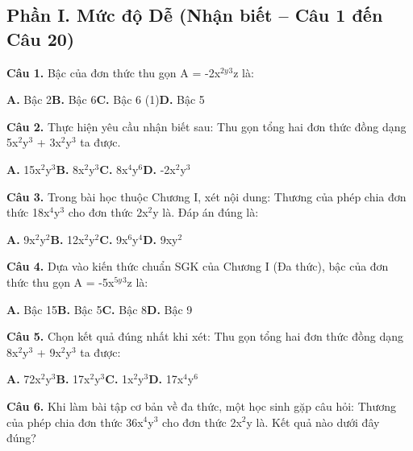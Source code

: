 \documentclass[11pt,a4paper]{article}
\begin{document}
\subsection*{\color{accent} Phần I. Mức độ Dễ (Nhận biết -- Câu 1 đến Câu 20)}
\textbf{\color{primary} Câu 1.} Bậc của đơn thức thu gọn A = -2x$^{2y}$$^3$z là:\par
\hspace*{1.5em}\textbf{A.} Bậc 2\quad\quad \textbf{B.} Bậc 6\quad\quad \textbf{C.} Bậc 6 (1)\quad\quad \textbf{D.} Bậc 5\par\vspace{2pt}
\textbf{\color{primary} Câu 2.} Thực hiện yêu cầu nhận biết sau: Thu gọn tổng hai đơn thức đồng dạng 5x$^2$y$^3$ + 3x$^2$y$^3$ ta được.\par
\hspace*{1.5em}\textbf{A.} 15x$^2$y$^3$\quad\quad \textbf{B.} 8x$^2$y$^3$\quad\quad \textbf{C.} 8x$^4$y$^6$\quad\quad \textbf{D.} -2x$^2$y$^3$\par\vspace{2pt}
\textbf{\color{primary} Câu 3.} Trong bài học thuộc Chương I, xét nội dung: Thương của phép chia đơn thức 18x$^4$y$^3$ cho đơn thức 2x$^2$y là. Đáp án đúng là:\par
\hspace*{1.5em}\textbf{A.} 9x$^2$y$^2$\quad\quad \textbf{B.} 12x$^2$y$^2$\quad\quad \textbf{C.} 9x$^6$y$^4$\quad\quad \textbf{D.} 9xy$^2$\par\vspace{2pt}
\textbf{\color{primary} Câu 4.} Dựa vào kiến thức chuẩn SGK của Chương I (Đa thức), bậc của đơn thức thu gọn A = -5x$^{5y}$$^3$z là:\par
\hspace*{1.5em}\textbf{A.} Bậc 15\quad\quad \textbf{B.} Bậc 5\quad\quad \textbf{C.} Bậc 8\quad\quad \textbf{D.} Bậc 9\par\vspace{2pt}
\textbf{\color{primary} Câu 5.} Chọn kết quả đúng nhất khi xét: Thu gọn tổng hai đơn thức đồng dạng 8x$^2$y$^3$ + 9x$^2$y$^3$ ta được:\par
\hspace*{1.5em}\textbf{A.} 72x$^2$y$^3$\quad\quad \textbf{B.} 17x$^2$y$^3$\quad\quad \textbf{C.} 1x$^2$y$^3$\quad\quad \textbf{D.} 17x$^4$y$^6$\par\vspace{2pt}
\textbf{\color{primary} Câu 6.} Khi làm bài tập cơ bản về đa thức, một học sinh gặp câu hỏi: Thương của phép chia đơn thức 36x$^4$y$^3$ cho đơn thức 2x$^2$y là. Kết quả nào dưới đây đúng?\par
\end{document}
